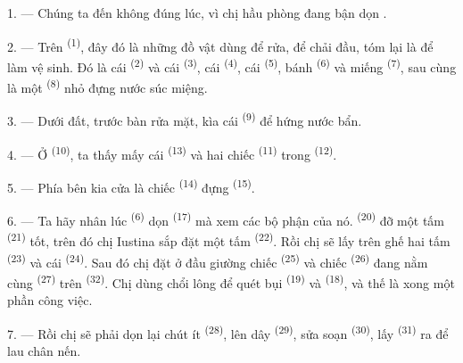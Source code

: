 \VUsaut{3.0mm}

1. --- Chúng ta đến không đúng lúc, vì chị hầu phòng đang bận dọn .

2. --- Trên  \textsuperscript{(1)}, đây đó là những đồ vật dùng để
rửa, để chải đầu, tóm lại là để làm vệ sinh. Đó là cái 
\textsuperscript{(2)} và cái  \textsuperscript{(3)}, cái  \textsuperscript{(4)}, cái  \textsuperscript{(5)}, bánh
 \textsuperscript{(6)} và miếng 
\textsuperscript{(7)}, sau cùng là một  \textsuperscript{(8)} nhỏ đựng nước
súc miệng.

3. --- Dưới đất, trước bàn rửa mặt, kìa cái  \textsuperscript{(9)} để hứng
nước bẩn.

4. --- Ở  \textsuperscript{(10)}, ta thấy mấy cái 
\textsuperscript{(13)} và hai chiếc  \textsuperscript{(11)} trong  \textsuperscript{(12)}.

5. --- Phía bên kia cửa là chiếc  \textsuperscript{(14)} đựng
 \textsuperscript{(15)}.

6. --- Ta hãy nhân lúc  \textsuperscript{(6)} dọn 
\textsuperscript{(17)} mà xem các bộ phận của nó. 
\textsuperscript{(20)} đỡ một tấm  \textsuperscript{(21)} tốt, trên đó
chị Iustina sắp đặt một tấm  \textsuperscript{(22)}. Rồi chị sẽ lấy trên
ghế hai tấm  \textsuperscript{(23)} và cái 
\textsuperscript{(24)}. Sau đó chị đặt ở đầu giường chiếc 
\textsuperscript{(25)} và chiếc  \textsuperscript{(26)} đang nằm cùng
 \textsuperscript{(27)} trên 
\textsuperscript{(32)}. Chị dùng chổi lông để quét bụi 
\textsuperscript{(19)} và  \textsuperscript{(18)}, và thế là xong
một phần công việc.

7. --- Rồi chị sẽ phải dọn lại chút ít  \textsuperscript{(28)}, lên dây
 \textsuperscript{(29)}, sửa soạn 
\textsuperscript{(30)}, lấy  \textsuperscript{(31)} ra để lau chân nến.

\VUsaut{5.0mm}
\VUsaut{3.0mm}

